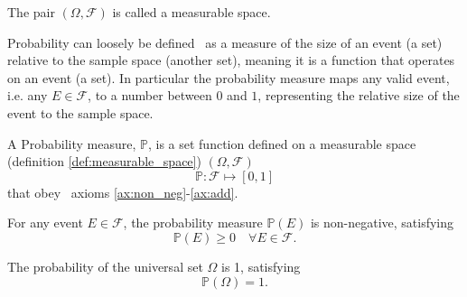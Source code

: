 \begin{definition}
	\label{def:measurable_space}
	The pair \( (\Omega, \mathcal{F}) \) is called a measurable space.
\end{definition}

Probability can loosely be defined~\cite{chan2021introduction} as a measure of the size of an event (a set) relative to the sample space (another set), meaning it is a function that operates on an event (a set). In particular the probability measure maps any valid event, i.e. any $E\in \mathcal{F}$, to a number between $0$ and $1$, representing the relative size of the event to the sample space.

\begin{definition}
	\label{def:probability}
	A Probability measure, $\mathbb{P}$, is a set function  defined on a measurable space (definition \ref{def:measurable_space}) $(\Omega, \mathcal{F})$
	\begin{equation}
		\mathbb{P}: \mathcal{F} \mapsto [0,1]
	\end{equation}
	that obey~\cite{kolmogorov1950foundations} axioms \ref{ax:non_neg}-\ref{ax:add}.
\end{definition}

\begin{axiom}
	\label{ax:non_neg}
	For any event $E\in \mathcal{F}$, the probability measure $\mathbb{P}(E)$ is non-negative, satisfying
	\begin{equation}
		\mathbb{P}(E) \geq 0 \quad \forall E \in  \mathcal{F}.
	\end{equation}
\end{axiom}

\begin{axiom}[Normalization]
	\label{ax:norm}
	The probability of the universal set $\Omega$ is 1, satisfying
	\begin{equation}
		\mathbb{P}(\Omega) = 1.
	\end{equation}
\end{axiom}

